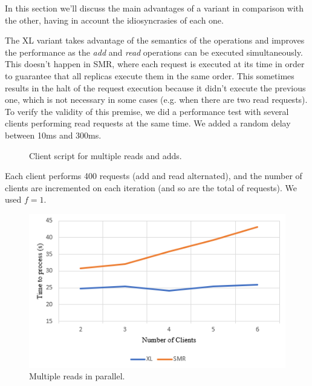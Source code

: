 \documentclass[times, 10pt,twocolumn]{article}
\begin{document}
In this section we'll discuss the main advantages of a variant in comparison with the other,
having in account the idiosyncrasies of each one.

The XL variant takes advantage of the semantics of the operations and improves the performance
as the \textit{add} and \textit{read} operations can be executed simultaneously. This doesn't 
happen in SMR, where each request is executed at its time in order to guarantee that all replicas execute them
in the same order. This sometimes results in the halt of the request execution because it didn't execute the previous one, 
which is not necessary in some cases (e.g. when there are two read requests). To verify the validity of this premise, we did a performance test with several clients performing read requests at the same time. We added a random delay between 10ms and 300ms.
\newline\newline
{}
\begin{figure}[h]
\caption{Client script for multiple reads and adds.}
\label{fig:manyreads_code}
\end{figure}

Each client performs 400 requests (add and read alternated), and the number of clients are incremented on each iteration (and so are the total
of requests). We used $f=1$.

\begin{figure}[h]
\centering
\includegraphics[width=1\linewidth]{images/manyreads.png}
\caption{Multiple reads in parallel.}
\label{fig:manyreads}
\end{figure}
\end{document}
